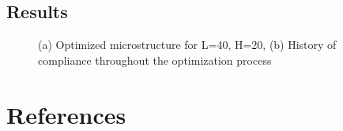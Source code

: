 \documentclass[10pt]{article}
\begin{document}
\subsection{Results}
\begin{figure}[H]
\begin{center}
	\label{fig:height}
	\caption{(a) Optimized microstructure for L=40, H=20, (b) History of compliance throughout the optimization process}
\end{center}
\end{figure}

\newpage
\section{References}


\end{document}
